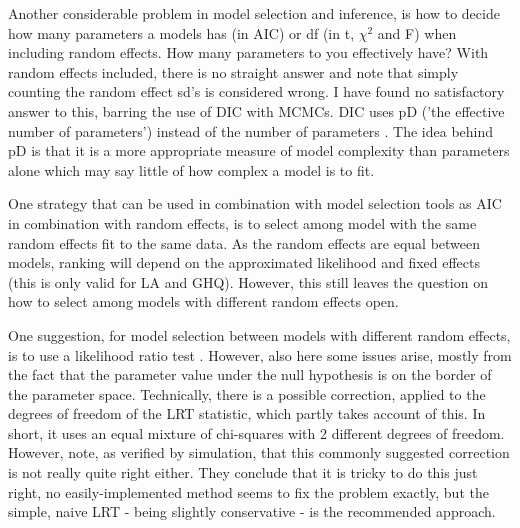 \documentclass{article}\usepackage[]{graphicx}\usepackage[]{color}
\numberwithin{equation}{section} %
\numberwithin{figure}{section} %
\numberwithin{table}{section} %
\begin{document}
Another considerable problem in model selection and inference, is how to decide how many parameters a models has (in AIC) or df (in t, $\chi^2$ and F) when including random effects. How many parameters to you effectively have? With random effects included, there is no straight answer and note that simply counting the random effect sd's is considered wrong. I have found no satisfactory answer to this, barring the use of DIC with MCMCs. DIC uses pD ('the effective number of parameters') instead of the number of parameters \citep{Spiegelhalter2002}. The idea behind pD is that it is a more appropriate measure of model complexity than parameters alone which may say little of how complex a model is to fit.  

One strategy that can be used in combination with model selection tools as AIC in combination with random effects, is to select among model with the same random effects fit to the same data. As the random effects are equal between models, ranking will depend on the approximated likelihood and fixed effects (this is only valid for LA and GHQ). However, this still leaves the question on how to select among models with different random effects open.

One suggestion, for model selection between models with different random effects, is to use a likelihood ratio test \citep[][pp. 83-87]{Pinheiro2000}. However, also here some issues arise, mostly from the fact that the parameter value under the null hypothesis is on the border of the parameter space. Technically, there is a possible correction, applied to the degrees of freedom of the LRT statistic, which partly takes account of this. In short, it uses an equal mixture of chi-squares with 2 different degrees of freedom. However, \citet{Pinheiro2000} note, as verified by simulation, that this commonly suggested correction is not really quite right either. They conclude that it is tricky to do this just right, no easily-implemented method seems to fix the problem exactly, but the simple, naive LRT - being slightly conservative - is the recommended approach. 
\end{document}
